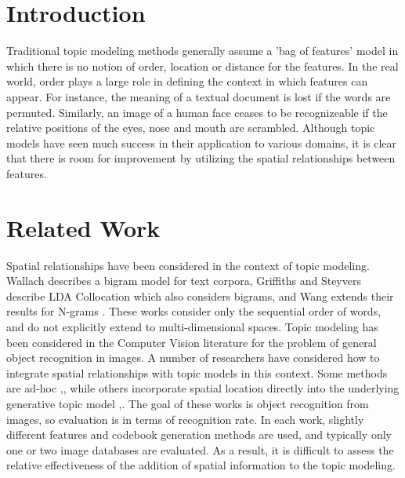 \documentclass[twocolumn]{article}
\begin{document}

 

\section{Introduction}
Traditional topic modeling methods generally assume a 'bag of features' model in which there is no notion of order, location or distance for the features.   In the real world, order plays a large role in defining the context in which features can appear.  For instance, the meaning of a textual document is lost if the words are permuted.  Similarly, an image of a human face ceases to be recognizeable if the relative positions of the eyes, nose and mouth are scrambled.  Although topic models have seen much success in their application to various domains, it is clear that there is room for improvement by utilizing the spatial relationships between features. 

\section{Related Work}
Spatial relationships have been considered in the context of topic modeling.  Wallach\cite{wallach2006} describes a bigram model for text corpora,  Griffiths and Steyvers \cite{griffiths2005} describe LDA Collocation which also considers bigrams, and Wang extends their results for N-grams \cite{xwang2005}.  These works consider only the sequential order of words, and do not explicitly extend to multi-dimensional spaces.  Topic modeling has been considered in the Computer Vision literature for the problem of general object recognition in images.  A number of researchers have considered how to integrate spatial relationships with topic models in this context.  Some methods are ad-hoc \cite{lazebnik2006},\cite{russell2006}, while others incorporate spatial location directly into the underlying generative topic model \cite{xwang2007},\cite{sudderth2005}.  The goal of these works is object recognition from images, so evaluation is in terms of recognition rate.  In each work, slightly different features and codebook generation methods are used, and typically only one or two image databases are evaluated.  As a result, it is difficult to assess the relative effectiveness of the addition of spatial information to the topic modeling.
\end{document}
